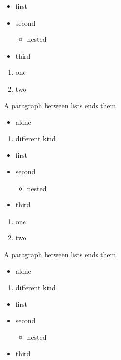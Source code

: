 \begin{itemize}
\item first
\item second

\begin{itemize}
\item nested
\end{itemize}
\item third
\end{itemize}

\begin{enumerate}
\item one
\item two
\end{enumerate}

A paragraph between lists ends them.

\begin{itemize}
\item alone
\end{itemize}

\begin{enumerate}
\item different kind
\end{enumerate}
\begin{itemize}
\item first
\item second

\begin{itemize}
\item nested
\end{itemize}
\item third
\end{itemize}

\begin{enumerate}
\item one
\item two
\end{enumerate}

A paragraph between lists ends them.

\begin{itemize}
\item alone
\end{itemize}

\begin{enumerate}
\item different kind
\end{enumerate}
\begin{itemize}
\item first
\item second

\begin{itemize}
\item nested
\end{itemize}
\item third
\end{itemize}

